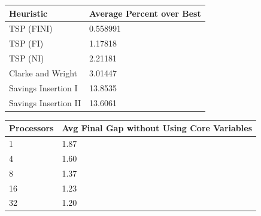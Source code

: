 \documentclass[headrule,landscape]{foils}
\def\blu#1{\textcolor{blue}{#1}}
\newcommand{\foil}[1]{\foilhead[-.6in]{\blu{#1}}}
\begin{document}

\foil{Computational Results: Best Clustering Strategies}

\begin{center}
\begin{tabular}{||l|l||}
\hline
Heuristic & Average Percent over Best\\\hline\hline
TSP (FINI) & 0.558991\\\hline
TSP (FI) & 1.17818\\\hline
TSP (NI) & 2.21181\\\hline
Clarke and Wright & 3.01447\\\hline
Savings Insertion I & 13.8535\\\hline
Savings Insertion II & 13.6061\\\hline
\hline
\end{tabular}
\end{center}


\foil{Computational Results: Effect of Parallelism on Gap}
\begin{center}
\begin{tabular}{||l|l||}
\hline
Processors & Avg Final Gap without Using Core Variables \\\hline\hline
1 & 1.87\\\hline
4 & 1.60 \\\hline
8 & 1.37 \\\hline
16 & 1.23 \\\hline
32 & 1.20 \\\hline
\hline
\end{tabular}
\end{center}

\end{document}
